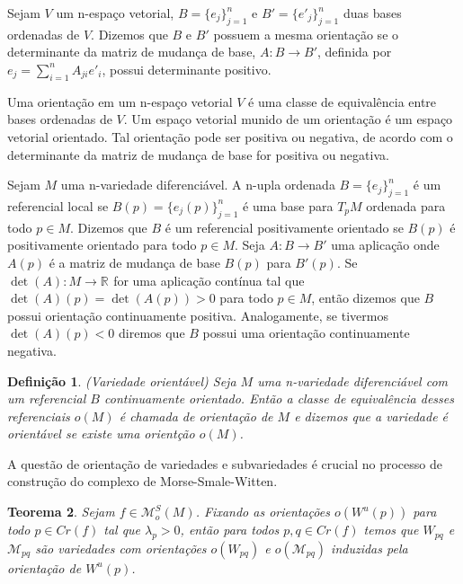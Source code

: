 \documentclass[12pt]{book}
\newtheorem{teorema}{Teorema}[section]
\newtheorem{definicao}[teorema]{Definição}
\newcommand{\espacomoduli}[2]{\mathcal{M}_{#1#2}}
\newcommand{\espacotangenteponto}[2]{T_{#1}#2}
\newcommand{\funcoesmorsesmale}[1]{\mathcal{M}^{S}_{o}(#1)}
\newcommand{\pontoscriticos}[1]{\textit{Cr}(#1)}
\newcommand{\real}[1]{\mathbb{R}^{#1}}
\newcommand{\reta}{\real{}}
\newcommand{\variedadeconectantepontos}[2]{W_{#1#2}}
\newcommand{\variedadeinstavel}[1]{W^{u}(#1)}
\begin{document}
	Sejam $V$ um n-espaço vetorial, $B=\{e_{j}\}_{j=1}^{n}$ e $B'=\{e'_{j}\}_{j=1}^{n}$ duas bases ordenadas de $V$. Dizemos que $B$ e $B'$ possuem a mesma orientação se o determinante da matriz de mudança de base, $A: B \to B'$, definida por $e_{j} = \sum_{i=1}^{n}A_{ji}e'_{i}$, possui determinante positivo. 
	
	Uma orientação em um n-espaço vetorial $V$ é uma classe de equivalência entre bases ordenadas de $V$. Um espaço vetorial munido de um orientação é um espaço vetorial orientado. Tal orientação pode ser positiva ou negativa, de acordo com o determinante da matriz de mudança de base for positiva ou negativa.
	
	Sejam $M$ uma n-variedade diferenciável. A n-upla ordenada $B=\{e_{j}\}_{j=1}^{n}$ é um referencial local se $B(p)=\{e_{j}(p)\}_{j=1}^{n}$ é uma base para $\espacotangenteponto{p}{M}$ ordenada para todo $p \in M$. Dizemos que $B$ é um referencial positivamente orientado se $B(p)$ é positivamente orientado para todo $p \in M$. Seja $A: B \to B'$ uma aplicação onde $A(p)$ é a matriz de mudança de base $B(p) $ para $B'(p)$. Se $\det(A):M \to \reta$ for uma aplicação contínua tal que $\det(A)(p) = \det(A(p))>0$ para todo $p \in M$, então dizemos que $B$ possui orientação continuamente positiva. Analogamente, se tivermos $\det(A)(p)<0$ diremos que $B$ possui uma orientação continuamente negativa.
	
	\begin{definicao}
		(Variedade orientável) Seja $M$ uma n-variedade diferenciável com um referencial $B$ continuamente orientado. Então a classe de equivalência desses referenciais $o(M)$ é chamada de orientação de $M$ e dizemos que a variedade é orientável se existe uma orientção $o(M)$.
	\end{definicao}
	
	A questão de orientação de variedades e subvariedades é crucial no processo de construção do complexo de Morse-Smale-Witten.
	
	\begin{teorema}\label{teorema_orientacao_variedade_instavel}
		Sejam $f \in \funcoesmorsesmale{M}$. Fixando as orientações $o(\variedadeinstavel{p})$ para todo $p \in \pontoscriticos{f}$ tal que $\lambda_{p}>0$, então para todos $p,q \in \pontoscriticos{f}$ temos que $\variedadeconectantepontos{p}{q}$ e $\espacomoduli{p}{q}$ são variedades com orientações $o(\variedadeconectantepontos{p}{q})$ e $o(\espacomoduli{p}{q})$ induzidas pela orientação de $\variedadeinstavel{p}$.
	\end{teorema}
	
\end{document}
